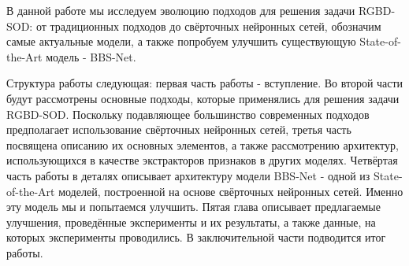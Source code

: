 В данной работе мы исследуем эволюцию подходов для решения задачи RGBD-SOD: от традиционных подходов до свёрточных нейронных сетей, обозначим самые актуальные модели,
а также попробуем улучшить существующую State-of-the-Art модель - BBS-Net\cite{BBS}.

Структура работы следующая: первая часть работы - вступление. Во второй части будут рассмотрены основные подходы, которые применялись для решения задачи RGBD-SOD. Поскольку подавляющее большинство
современных подходов предполагает использование свёрточных нейронных сетей, третья часть посвящена описанию их основных элементов, а также рассмотрению
архитектур, использующихся в качестве экстракторов признаков в других моделях. Четвёртая часть работы в деталях описывает архитектуру модели BBS-Net\cite{BBS} - одной
из State-of-the-Art моделей, построенной на основе свёрточных нейронных сетей. Именно эту модель мы и попытаемся улучшить. Пятая глава
описывает предлагаемые улучшения, проведённые эксперименты и их результаты, а также данные, на которых эксперименты проводились. В заключительной части
подводится итог работы.